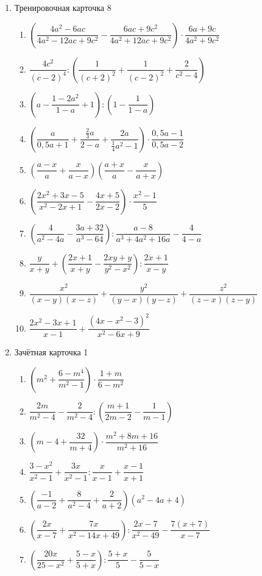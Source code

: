 \documentclass[12pt, a4paper]{article}
\begin{document}
\begin{enumerate}
\begin{enumerate}[label=\asbuk*)]
	\end{enumerate}
	\item Тренировочная карточка 8
	\begin{enumerate}[label=\asbuk*)]
		\item \( \left( \dfrac{4a^2-6ac}{4a^2-12ac+9c^2}-\dfrac{6ac+9c^2}{4a^2+12ac+9c^2} \right)\cdot\dfrac{6a+9c}{4a^2+9c^2} \)
		\item \( \dfrac{4c^2}{(c-2)^4} :\left( \dfrac{1}{(c+2)^2}+\dfrac{1}{(c-2)^2}+\dfrac{2}{c^2-4} \right)\)
		\item \( \left( a-\dfrac{1-2a^2}{1-a}+1 \right):\left( 1-\dfrac{1}{1-a} \right) \)
		\item \( \left( \dfrac{a}{0,5a+1} +\dfrac{\frac{2}{3}a}{2-a}+\dfrac{2a}{\frac{1}{4}a^2-1}\right)\cdot\dfrac{0,5a-1}{0,5a-2} \)
		\item \( \left( \dfrac{a-x}{a}+\dfrac{x}{a-x} \right)\left( \dfrac{a+x}{a}-\dfrac{x}{a+x} \right) \)
		\item \( \left( \dfrac{2x^2+3x-5}{x^2-2x+1}-\dfrac{4x+5}{2x-2} \right)\cdot\dfrac{x^2-1}{5} \)
		\item \(\left( \dfrac{4}{a^2-4a}-\dfrac{3a+32}{a^3-64} \right):\dfrac{a-8}{a^3+4a^2+16a}-\dfrac{4}{4-a}\)
		\item \( \dfrac{y}{x+y}+\left( \dfrac{2x+1}{x+y}-\dfrac{2xy+y}{y^2-x^2} \right):\dfrac{2x+1}{x-y} \)
		\item \( \dfrac{x^2}{(x-y)(x-z)}+\dfrac{y^2}{(y-x)(y-z)}+\dfrac{z^2}{(z-x)(z-y)} \)
		\item \( \dfrac{2x^2-3x+1}{x-1}+\dfrac{(4x-x^2-3)^2}{x^2-6x+9} \)
	\end{enumerate}
	\item Зачётная карточка 1
	\begin{enumerate}[label=\asbuk*)]
		\item \( \left( m^2+\dfrac{6-m^4}{m^2-1} \right) \cdot\dfrac{1+m}{6-m^2}\)
		\item \( \dfrac{2m}{m^2-4}-\dfrac{2}{m^2-4}:\left( \dfrac{m+1}{2m-2}-\dfrac{1}{m-1} \right) \)
		\item \( \left( m-4+\dfrac{32}{m+4} \right) \cdot\dfrac{m^2+8m+16}{m^2+16}\)
		\item \( \dfrac{3-x^2}{x^2-1}+\dfrac{3x}{x^2-1}:\dfrac{x}{x-1}+\dfrac{x-1}{x+1} \)
		\item \( \left( \dfrac{-1}{a-2}+\dfrac{8}{a^2-4}+\dfrac{2}{a+2} \right) (a^2-4a+4)\)
		\item \( \left( \dfrac{2x}{x-7}+ \dfrac{7x}{x^2-14x+49}\right) :\dfrac{2x-7}{x^2-49}-\dfrac{7(x+7)}{x-7}\)
		\item \( \left( \dfrac{20x}{25-x^2}+\dfrac{5-x}{5+x} \right) :\dfrac{5+x}{5}-\dfrac{5}{5-x}\)

\end{enumerate}
\end{enumerate}
\end{document}
